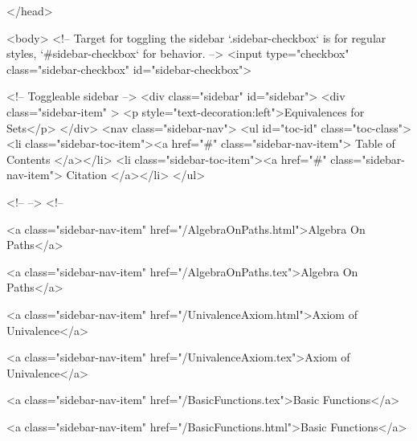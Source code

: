   
</head>




  <body>
    <!-- Target for toggling the sidebar `.sidebar-checkbox` is for regular
     styles, `#sidebar-checkbox` for behavior. -->
<input type="checkbox" class="sidebar-checkbox" id="sidebar-checkbox">

<!-- Toggleable sidebar -->
<div class="sidebar" id="sidebar">
  <div class="sidebar-item" >
    <p style="text-decoration:left">Equivalences for Sets</p>
  </div>
  <nav class="sidebar-nav">
    <ul id="toc-id" class="toc-class">
  <li class="sidebar-toc-item"><a href="#" class="sidebar-nav-item"> Table of Contents </a></li>
  <li class="sidebar-toc-item"><a href="#" class="sidebar-nav-item"> Citation </a></li>
</ul>


    <!--  -->
    <!-- 
      
    
      
    
      
    
      
        
      
    
      
        
          <a class="sidebar-nav-item" href="/AlgebraOnPaths.html">Algebra On Paths</a>
        
      
    
      
        
          <a class="sidebar-nav-item" href="/AlgebraOnPaths.tex">Algebra On Paths</a>
        
      
    
      
        
          <a class="sidebar-nav-item" href="/UnivalenceAxiom.html">Axiom of Univalence</a>
        
      
    
      
        
          <a class="sidebar-nav-item" href="/UnivalenceAxiom.tex">Axiom of Univalence</a>
        
      
    
      
        
          <a class="sidebar-nav-item" href="/BasicFunctions.tex">Basic Functions</a>
        
      
    
      
        
          <a class="sidebar-nav-item" href="/BasicFunctions.html">Basic Functions</a>
        
      
    
      
        
